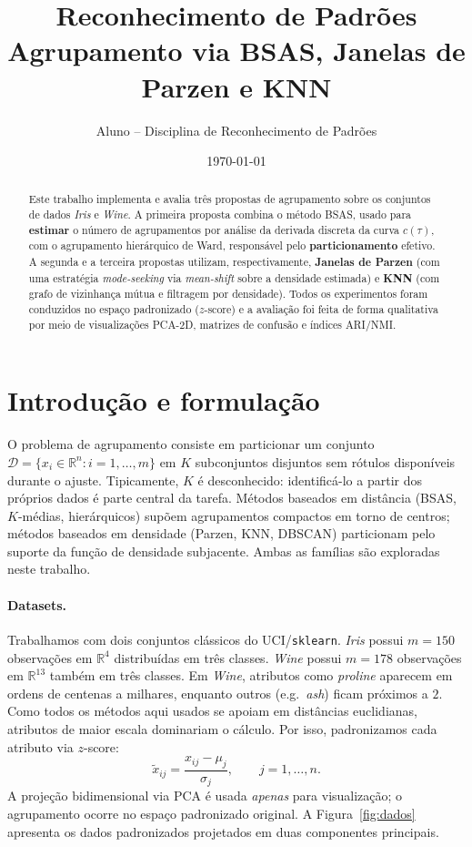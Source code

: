 \documentclass[11pt,a4paper]{article}
\title{\textbf{Reconhecimento de Padrões} \\[0.4em]
       \large Agrupamento via BSAS, Janelas de Parzen e KNN}
\author{Aluno -- Disciplina de Reconhecimento de Padrões}
\date{\today}
\newcommand{\R}{\mathbb{R}}
\begin{document}
\maketitle

\begin{abstract}
\noindent
Este trabalho implementa e avalia três propostas de agrupamento sobre os conjuntos de dados \emph{Iris} e \emph{Wine}.
A primeira proposta combina o método BSAS, usado para \textbf{estimar} o número de agrupamentos por análise da derivada discreta da curva $c(\tau)$, com o agrupamento hierárquico de Ward, responsável pelo \textbf{particionamento} efetivo.
A segunda e a terceira propostas utilizam, respectivamente, \textbf{Janelas de Parzen} (com uma estratégia \emph{mode-seeking} via \emph{mean-shift} sobre a densidade estimada) e \textbf{KNN} (com grafo de vizinhança mútua e filtragem por densidade).
Todos os experimentos foram conduzidos no espaço padronizado ($z$-score) e a avaliação foi feita de forma qualitativa por meio de visualizações PCA-2D, matrizes de confusão e índices ARI/NMI.
\end{abstract}

\section{Introdução e formulação}
O problema de agrupamento consiste em particionar um conjunto $\mathcal{D} = \{x_i \in \R^n : i = 1, \dots, m\}$ em $K$ subconjuntos disjuntos sem rótulos disponíveis durante o ajuste.
Tipicamente, $K$ é desconhecido: identificá-lo a partir dos próprios dados é parte central da tarefa.
Métodos baseados em distância (BSAS, $K$-médias, hierárquicos) supõem agrupamentos compactos em torno de centros; métodos baseados em densidade (Parzen, KNN, DBSCAN) particionam pelo suporte da função de densidade subjacente.
Ambas as famílias são exploradas neste trabalho.

\paragraph{Datasets.}
Trabalhamos com dois conjuntos clássicos do UCI/\texttt{sklearn}.
\emph{Iris} possui $m=150$ observações em $\R^4$ distribuídas em três classes.
\emph{Wine} possui $m=178$ observações em $\R^{13}$ também em três classes.
Em \emph{Wine}, atributos como \emph{proline} aparecem em ordens de centenas a milhares, enquanto outros (e.g.\ \emph{ash}) ficam próximos a $2$. Como todos os métodos aqui usados se apoiam em distâncias euclidianas, atributos de maior escala dominariam o cálculo. Por isso, padronizamos cada atributo via $z$-score:
\begin{equation}
  \tilde{x}_{ij} = \frac{x_{ij} - \mu_j}{\sigma_j}, \qquad j = 1, \dots, n.
\end{equation}
A projeção bidimensional via PCA é usada \emph{apenas} para visualização; o agrupamento ocorre no espaço padronizado original.
A Figura~\ref{fig:dados} apresenta os dados padronizados projetados em duas componentes principais.
\end{document}
